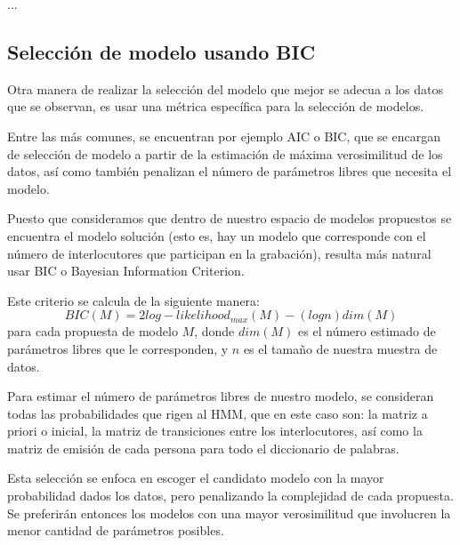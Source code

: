 ...

\subsection{Selección de modelo usando BIC}

\begin{comment} 
Una vez que se tienen los parámetros estimados para cada uno de los modelos correspondientes a las propuestas, se necesita ver cuál es el modelo que mejor se ajusta a los datos.
\end{comment} 

Otra manera de realizar la selección del modelo que mejor se adecua a los datos que se observan, es usar una métrica específica para la selección de modelos.

Entre las más comunes, se encuentran por ejemplo AIC o BIC, que se encargan de selección de modelo a partir de la estimación de máxima verosimilitud de los datos, así como también penalizan el número de parámetros libres que necesita el modelo.

Puesto que consideramos que dentro de nuestro espacio de modelos propuestos se encuentra el modelo solución (esto es, hay un modelo que corresponde con el número de interlocutores que participan en la grabación), resulta más natural usar BIC o Bayesian Information Criterion.

Este criterio se calcula de la siguiente manera: 
\begin{equation}
BIC(M) = 2 log-likelihood_{max}(M) - (log n ) dim(M)
\end{equation}
para cada propuesta de modelo $M$, donde $dim(M)$ es el número estimado de parámetros libres que le corresponden, y $n$ es el tamaño de nuestra muestra de datos.

Para estimar el número de parámetros libres de nuestro modelo, se consideran todas las probabilidades que rigen al HMM, que en este caso son: la matriz a priori o inicial, la matriz de transiciones entre los interlocutores, así como la matriz de emisión de cada persona para todo el diccionario de palabras.

Esta selección se enfoca en escoger el candidato modelo con la mayor probabilidad dados los datos, pero penalizando la complejidad de cada propuesta. Se preferirán entonces los modelos con una mayor verosimilitud que involucren la menor cantidad de parámetros posibles. 


